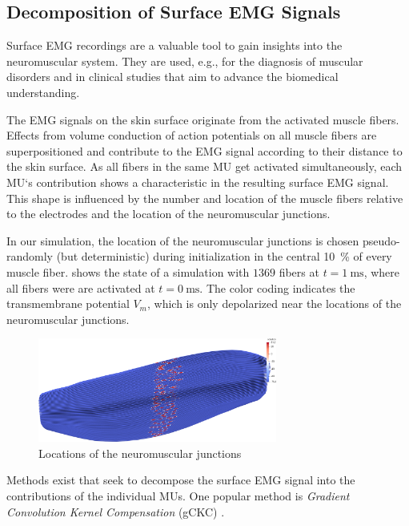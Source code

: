 \subsection{Decomposition of Surface EMG Signals}

Surface EMG recordings are a valuable tool to gain insights into the neuromuscular system. They are used, e.g., for the diagnosis of muscular disorders and in clinical studies that aim to advance the biomedical understanding.

The EMG signals on the skin surface originate from the activated muscle fibers. Effects from volume conduction of action potentials on all muscle fibers are superpositioned and contribute to the EMG signal according to their distance to the skin surface. As all fibers in the same MU get activated simultaneously, each MU`s contribution shows a characteristic  in the resulting surface EMG signal. This shape is influenced by the number and location of the muscle fibers relative to the electrodes and the location of the neuromuscular junctions.

In our simulation, the location of the neuromuscular junctions is chosen pseudo-randomly (but deterministic) during initialization in the central \SI{10}{\percent} of every muscle fiber.  shows the state of a simulation with $1369$ fibers at $t=\SI{1}{\ms}$, where all fibers were are activated at $t=\SI{0}{\ms}$. The color coding indicates the transmembrane potential $V_m$, which is only depolarized near the locations of the neuromuscular junctions.

\begin{figure}
  \centering%
  \includegraphics[width=0.7\textwidth]{images/results/application/emg_video_37_junctions.png}%
  \caption{Locations of the neuromuscular junctions}%
  \label{fig:emg_video_37_junctions}%
\end{figure}

Methods exist that seek to decompose the surface EMG signal into the contributions of the individual MUs. One popular method is \emph{Gradient Convolution Kernel Compensation} (gCKC) \cite{Holobar2007b,Holobar2007}. 


